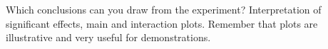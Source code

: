 Which conclusions can you draw from the experiment?
Interpretation of significant effects, main and interaction plots.
Remember that plots are illustrative and very useful for demonstrations.